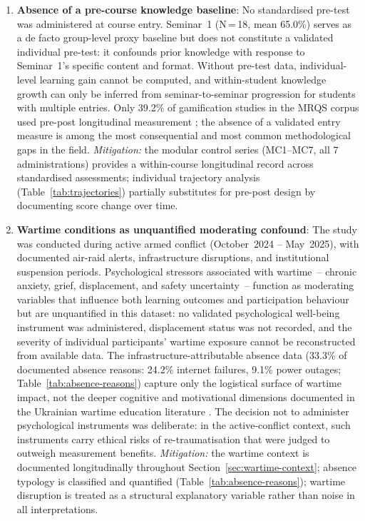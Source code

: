 \begin{enumerate}
\item \textbf{Absence of a pre-course knowledge baseline}: No standardised pre-test was administered at course entry. Seminar~1 (N\,=\,18, mean 65.0\%) serves as a de facto group-level proxy baseline but does not constitute a validated individual pre-test: it confounds prior knowledge with response to Seminar~1's specific content and format. Without pre-test data, individual-level learning gain cannot be computed, and within-student knowledge growth can only be inferred from seminar-to-seminar progression for students with multiple entries. Only 39.2\% of gamification studies in the MRQS corpus used pre-post longitudinal measurement \cite{Korniienko2025mrqs}; the absence of a validated entry measure is among the most consequential and most common methodological gaps in the field. \textit{Mitigation:} the modular control series (MC1--MC7, all 7 administrations) provides a within-course longitudinal record across standardised assessments; individual trajectory analysis (Table~\ref{tab:trajectories}) partially substitutes for pre-post design by documenting score change over time.

\item \textbf{Wartime conditions as unquantified moderating confound}: The study was conducted during active armed conflict (October~2024 -- May~2025), with documented air-raid alerts, infrastructure disruptions, and institutional suspension periods. Psychological stressors associated with wartime~-- chronic anxiety, grief, displacement, and safety uncertainty~-- function as moderating variables that influence both learning outcomes and participation behaviour \cite{UNESCO2023, Humeniuk2022113, Burde2017} but are unquantified in this dataset: no validated psychological well-being instrument was administered, displacement status was not recorded, and the severity of individual participants' wartime exposure cannot be reconstructed from available data. The infrastructure-attributable absence data (33.3\% of documented absence reasons: 24.2\% internet failures, 9.1\% power outages; Table~\ref{tab:absence-reasons}) capture only the logistical surface of wartime impact, not the deeper cognitive and motivational dimensions documented in the Ukrainian wartime education literature \cite{Martynets202428, Ovcharuk2023, Zamkova2023299}. The decision not to administer psychological instruments was deliberate: in the active-conflict context, such instruments carry ethical risks of re-traumatisation that were judged to outweigh measurement benefits. \textit{Mitigation:} the wartime context is documented longitudinally throughout Section~\ref{sec:wartime-context}; absence typology is classified and quantified (Table~\ref{tab:absence-reasons}); wartime disruption is treated as a structural explanatory variable rather than noise in all interpretations.

\end{enumerate}

